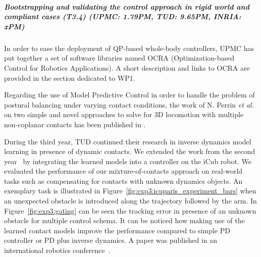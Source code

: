  
\subparagraph*{Bootstrapping and validating the control approach in rigid world and compliant cases (T3.4) (UPMC: 1.79PM, TUD: 9.65PM, INRIA: xPM)}
 
In order to ease the deployment of QP-based whole-body controllers, UPMC has put together a set of software libraries named OCRA (Optimization-based Control for Robotics Applications). A short description and links to OCRA are provided in the section dedicated to WP1.

Regarding the use of Model Predictive Control in order to handle the problem of postural balancing under varying contact conditions, the work of N. Perrin \textit{et al.} on two simple and novel approaches to solve for 3D locomotion with multiple non-coplanar contacts has been published in \cite{perrin_ISRR2015}.

During the third year, TUD continued their research in inverse dynamics model learning in presence of dynamic contacts. 
We extended the work from the second year~\cite{Calandra_ICRA15} by integrating the learned models into a controller on the iCub robot.
We evaluated the performance of our mixture-of-contacts approach on real-world tasks such as compensating for contacts with unknown dynamics objects.
An exemplary task is illustrated in Figure~\ref{fig:exp3:icuparis_experiment_bars} when an unexpected obstacle is introduced along the trajectory followed by the arm.
In Figure~\ref{fig:exp3:gating} can be seen the tracking error in presence of an unknown obstacle for multiple control schema. 
It can be noticed how making use of the learned contact models improve the performance compared to simple PD controller or PD plus inverse dynamics.
A paper was published in an international robotics conference~\cite{calandra2015learning}.


